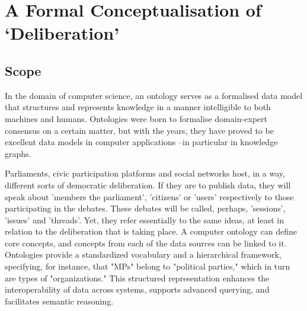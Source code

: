 \documentclass[runningheads]{llncs}  %
\begin{document}

\begin{comment}
This paper describes the development of the DKG, guided by an Ontology Requirements Specification Document (ORSD) that defines its purpose, scope, and requirements. We demonstrate the application of the DKG through the integration of diverse deliberation datasets, with a particular focus on European Parliament debates as a case study. We also present the technical implementation of data conversion pipelines, ontology mappings, and semantic querying capabilities.

The remainder of this paper is organized as follows: Section II reviews related work on deliberation ontologies and their limitations. Section III presents the DKG ontology, including its conceptual model and key components. Section IV describes the data integration process for connecting diverse deliberation datasets. Section V details the technical implementation of the DKG. Section VI presents a case study on European Parliament debates. Section VII evaluates the DKG against its requirements. Finally, Section VIII concludes the paper and discusses future work.
\end{comment}


\section{A Formal Conceptualisation of `Deliberation'}
\subsection{Scope}
In the domain of computer science, an ontology serves as a formalised data model that structures and represents knowledge in a manner intelligible to both machines and humans. Ontologies were born to formalise domain-expert consensus on a certain matter, but with the years, they have proved to be excellent data models in computer applications --in particular in knowledge graphs. 

Parliaments, civic participation platforms and social networks host, in a way, different sorts of democratic deliberation. If they are to publish data, they will speak about 'members the parliament', 'citizens' or 'users' respectively to those participating in the debates. These debates will be called, perhaps, 'sessions', 'issues' and 'threads'. Yet, they refer essentially to the same ideas, at least in relation to the deliberation that is taking place. A computer ontology can define core concepts, and concepts from each of the data sources can be linked to it. 
Ontologies provide a standardized vocabulary and a hierarchical framework, specifying, for instance, that "MPs" belong to "political parties," which in turn are types of "organizations." This structured representation enhances the interoperability of data across systems, supports advanced querying, and facilitates semantic reasoning. 
\end{document}
